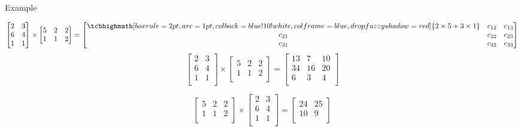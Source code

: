 \documentclass[ignorenonframetext,]{beamer}
\begin{document}
\begin{frame}{Example}
\protect\hypertarget{example}{}

\[
\begin{bmatrix}2&3 \\6&4 \\1&1 \\\end{bmatrix} \times \begin{bmatrix}5&2&2 \\1&1&2 \\\end{bmatrix}  =  \begin{bmatrix} \tcbhighmath[boxrule=2pt,arc=1pt,colback=blue!10!white,colframe=blue,
  drop fuzzy shadow=red]{ 2\times 5+3\times 1 }& c_{12} & c_{13}\\
c_{21}& c_{22} & c_{23}\\
c_{31}& c_{32} & c_{33}
\end{bmatrix}
\] \[
\begin{bmatrix}2&3 \\6&4 \\1&1 \\\end{bmatrix} \times \begin{bmatrix}5&2&2 \\1&1&2 \\\end{bmatrix}  =  \begin{bmatrix}13&7&10 \\34&16&20 \\6&3&4 \\\end{bmatrix}
\]

\[
\begin{bmatrix}5&2&2 \\1&1&2 \\\end{bmatrix} \times \begin{bmatrix}2&3 \\6&4 \\1&1 \\\end{bmatrix}  =  \begin{bmatrix}24&25 \\10&9 \\\end{bmatrix}
\]

\end{frame}
\end{document}
